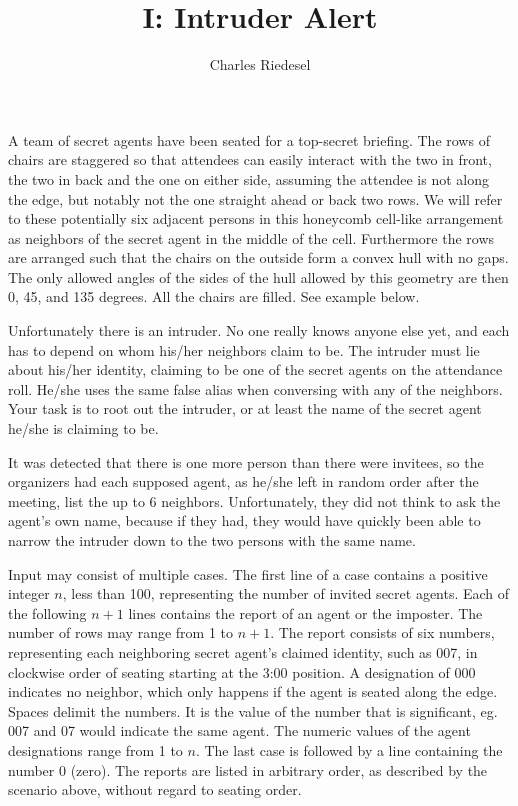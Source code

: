 \documentclass{article}
\title{I: Intruder Alert}
\author{Charles Riedesel}
\begin{document}
\begin{problemDescription}
A team of secret agents have been seated for a top-secret briefing.  The rows of
chairs are staggered so that attendees can easily interact with the two in
front, the two in back and the one on either side, assuming the attendee is
not along the edge, but notably not the one straight ahead or back two rows.  
We will refer to these potentially six adjacent persons in this honeycomb
cell-like arrangement as neighbors of the secret agent in the middle of the 
cell.  Furthermore the rows are 
arranged such that the chairs on the outside form a convex hull with no gaps.  
The only allowed angles of the sides of the hull allowed by this geometry are 
then 0, 45, and 135 degrees.  All the chairs are filled. See example below.

Unfortunately there is an intruder.  No one really knows anyone else yet, and
each has to depend on whom his/her neighbors claim to be.  The intruder must 
lie about his/her identity, claiming to be one of the secret agents on the
attendance roll.  He/she uses the same false alias when conversing with any
of the neighbors.  Your task is to root out the intruder, or at least the name
of the secret agent he/she is claiming to be.  

It was detected that there is one more person than there were invitees, so
the organizers had each supposed agent, as he/she left in random order after
the meeting, list the up to 6 neighbors. Unfortunately, they did not think
to ask the agent's own name, because if they had, they would have quickly
been able to narrow the intruder down to the two persons with the same name.
\end{problemDescription}

\begin{inputDescription}
Input may consist of multiple cases.  The first line of a case contains a 
positive integer $n$, less than 100, representing the number of invited secret
agents.  Each of the following $n+1$ lines contains the report of an agent
or the imposter.  The number of rows may range from 1 to $n+1$. The report 
consists of six numbers, representing each
neighboring secret agent's claimed identity, such as 007, in clockwise order 
of seating starting at the 3:00 position.  A designation of 000 indicates no 
neighbor, which only happens if the agent is seated along the edge.  Spaces 
delimit the numbers. It is the value of the number that is significant, 
eg. 007 and 07 would indicate the same agent. The numeric values of the agent
designations range from 1 to $n$.  The last case is followed by 
a line containing the number 0 (zero).  The reports are listed in arbitrary 
order, as described by the scenario above, without regard to seating order.
\end{inputDescription}
\end{document}

